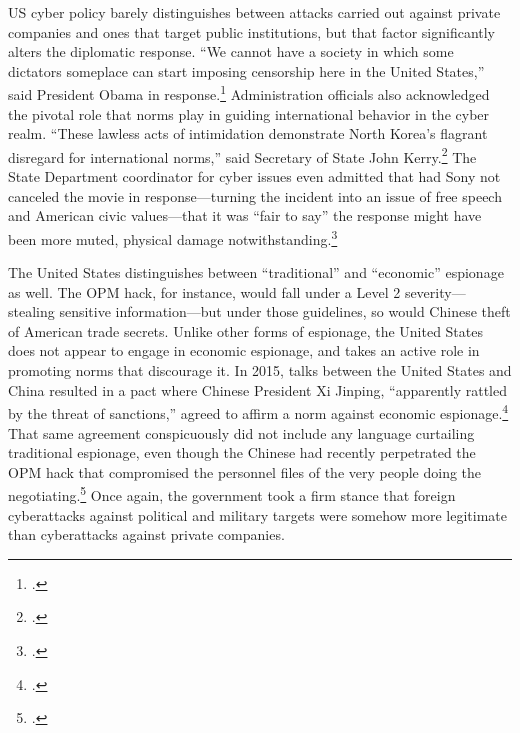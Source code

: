 \documentclass{memoir}
\begin{document}
\begin{refsegment}
US cyber policy barely distinguishes between attacks carried out against private companies and ones that target public institutions, but that factor significantly alters the diplomatic response. ``We cannot have a society in which some dictators someplace can start imposing censorship here in the United States,'' said President Obama in response.\footcite{perez_obama_2014} Administration officials also acknowledged the pivotal role that norms play in guiding international behavior in the cyber realm. ``These lawless acts of intimidation demonstrate North Korea's flagrant disregard for international norms,'' said Secretary of State John Kerry.\footcite{perez_obama_2014} The State Department coordinator for cyber issues even admitted that had Sony not canceled the movie in response---turning the incident into an issue of free speech and American civic values---that it was ``fair to say'' the response might have been more muted, physical damage notwithstanding.\footcite{nakashima_why_2015}


The United States distinguishes between ``traditional'' and ``economic'' espionage as well. The OPM hack, for instance, would fall under a Level 2 severity---stealing sensitive information---but under those guidelines, so would Chinese theft of American trade secrets. Unlike other forms of espionage, the United States does not appear to engage in economic espionage, and takes an active role in promoting norms that discourage it. In 2015, talks between the United States and China resulted in a pact where Chinese President Xi Jinping, ``apparently rattled by the threat of sanctions,'' agreed to affirm a norm against economic espionage.\footcite{nakashima_u.s._2015} That same agreement conspicuously did not include any language curtailing traditional espionage, even though the Chinese had recently perpetrated the OPM hack that compromised the personnel files of the very people doing the negotiating.\footcite{nakashima_u.s._2015} Once again, the government took a firm stance that foreign cyberattacks against political and military targets were somehow more legitimate than cyberattacks against private companies.


\end{refsegment}
\end{document}
